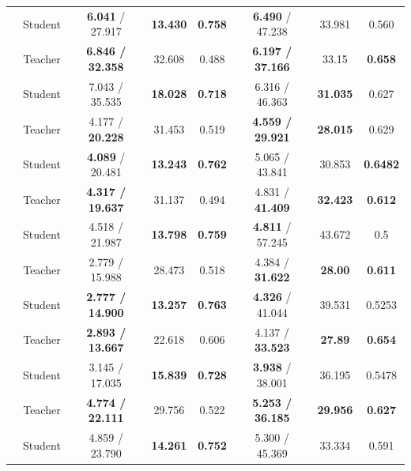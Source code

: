 \documentclass[10pt,twocolumn,letterpaper]{article}
\begin{document}
\begin{table}[htpb]
\begin{tabular}{c c c c c c c c}
                               & Student & \textbf{6.041} / 27.917 & \textbf{13.430} & \textbf{0.758} & \textbf{6.490} / 47.238 & 33.981 & 0.560\\
        \addlinespace
        \multirow{2}{*}{Front-Right} & Teacher & \textbf{6.846 / 32.358} & 32.608 & 0.488 & \textbf{6.197 / 37.166} & 33.15 & \textbf{0.658}\\
                               & Student & 7.043 / 35.535 & \textbf{18.028} & \textbf{0.718} & 6.316 / 46.363 & \textbf{31.035} & 0.627\\
        \addlinespace
        \multirow{2}{*}{Left} & Teacher & 4.177 / \textbf{20.228} & 31.453 & 0.519 & \textbf{4.559 / 29.921} & \textbf{28.015} & 0.629\\
                               & Student & \textbf{4.089} / 20.481 & \textbf{13.243} & \textbf{0.762} & 5.065 / 43.841 & 30.853 & \textbf{0.6482} \\
        \addlinespace
        \multirow{2}{*}{Right} & Teacher & \textbf{4.317 / 19.637} & 31.137 & 0.494 & 4.831 / \textbf{41.409} & \textbf{32.423} & \textbf{0.612}\\
                               & Student & 4.518 / 21.987 & \textbf{13.798} & \textbf{0.759} & \textbf{4.811} / 57.245 & 43.672 & 0.5 \\
        \addlinespace
        \multirow{2}{*}{Down-Left} & Teacher & 2.779 / 15.988 & 28.473 & 0.518 & 4.384 / \textbf{31.622} & \textbf{28.00} & \textbf{0.611}\\
                               & Student & \textbf{2.777 / 14.900} & \textbf{13.257} & \textbf{0.763} & \textbf{4.326} / 41.044 & 39.531 & 0.5253 \\
        \addlinespace
        \multirow{2}{*}{Down-Right} & Teacher & \textbf{2.893 / 13.667} & 22.618 & 0.606 & 4.137 / \textbf{33.523} & \textbf{27.89} & \textbf{0.654}\\
                               & Student & 3.145 / 17.035 & \textbf{15.839} & \textbf{0.728} & \textbf{3.938} / 38.001 & 36.195 & 0.5478 \\
        \bottomrule
        \addlinespace
        \multirow{2}{*}{Mean} & Teacher & \textbf{4.774 / 22.111} & 29.756 & 0.522 & \textbf{5.253 / 36.185} & \textbf{29.956} & \textbf{0.627}\\
                               & Student & 4.859 / 23.790 & \textbf{14.261} & \textbf{0.752} & 5.300 / 45.369 & 33.334 & 0.591 \\
        \bottomrule
    \end{tabular}

\end{table}
\end{document}
